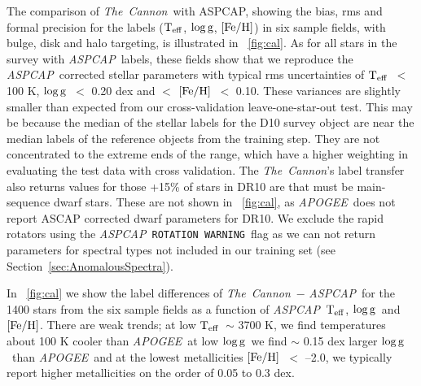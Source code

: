 \documentclass[12pt, preprint]{aastex}
\newcommand{\sectionname}{Section}
\newcommand{\tc}{\textsl{The~Cannon}}
\newcommand{\apogee}{\textsl{APOGEE}}
\newcommand{\aspcap}{\textsl{ASPCAP}}
\newcommand{\rotwarn}{\texttt{ROTATION WARNING}}
\newcommand{\teff}{\mbox{$\rm T_{eff}$}}
\newcommand{\feh}{\mbox{$\rm [Fe/H]$}}
\newcommand{\logg}{\mbox{$\rm \log g$}}
\begin{document}
The comparison of \tc\ with ASPCAP, showing the bias, rms and formal precision for the labels (\teff , \logg , \feh ) in six sample fields, with bulge, disk and halo targeting, is illustrated in \figurename~\ref{fig:cal}. As for all stars in the survey with \aspcap\ labels, these fields show that we reproduce the \aspcap\ corrected stellar parameters with typical rms uncertainties of \teff\ $<$ 100 K, \logg\ $<$ 0.20 dex and $<$ \feh\ $<$ 0.10. These variances are slightly smaller than expected from our cross-validation leave-one-star-out test. This may be because the median of the stellar labels for the D10 survey object are near the median labels of the reference objects from the training step. 
They are not concentrated to the extreme ends of the range, which have a higher weighting in evaluating the test data with cross validation. 
The \tc 's label transfer also returns values for those +15\% of stars in DR10 are that must be main-sequence dwarf stars. 
These are not shown in \figurename~\ref{fig:cal}, as \apogee\ does not report ASCAP corrected dwarf parameters for DR10. 
We exclude the rapid rotators using the \aspcap\ \rotwarn\ flag as we can not return parameters for spectral types not included in our training set (see \sectionname~\ref{sec:AnomalousSpectra}). 

In \figurename~\ref{fig:cal} we show the label differences of \tc\ $-$ \aspcap\ for the 1400 stars from the six sample fields as a function of \aspcap\ \teff, \logg\ and \feh. There are weak trends; at low \teff\ $\sim$ 3700 K, we find temperatures about 100 K cooler than \apogee\, at low \logg\ we find $\sim$ 0.15 dex larger \logg\ than \apogee\ and at the lowest metallicities \feh\ $<$ --2.0, we typically report higher metallicities on the order of 0.05 to 0.3 dex.
\end{document}

